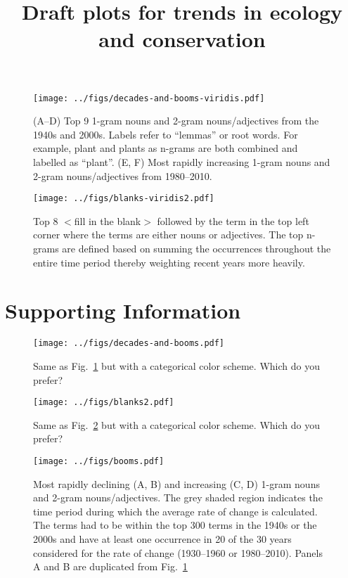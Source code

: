 \documentclass[12pt]{article}
\title{Draft plots for trends in ecology and conservation}
\author{}
\begin{document}
\maketitle


\begin{figure}[htbp]
\centering
\texttt{[image: ../figs/decades-and-booms-viridis.pdf]}
\caption{
(A--D) Top 9 1-gram nouns and 2-gram nouns/adjectives from the 1940s and 2000s.
Labels refer to ``lemmas'' or root words. For example, plant and plants as
n-grams are both combined and labelled as ``plant''. (E, F) Most rapidly
increasing 1-gram nouns and 2-gram nouns/adjectives from 1980--2010.}
\label{fig:decades}
\end{figure}

\begin{figure}[htbp]
\centering
\texttt{[image: ../figs/blanks-viridis2.pdf]}
\caption{Top 8 $<$fill in the blank$>$ followed by the term in the top left
corner where the terms are either nouns or adjectives. The top n-grams are
defined based on summing the occurrences throughout the entire time period
thereby weighting recent years more heavily.}
\label{fig:top}
\end{figure}

\clearpage

\section{Supporting Information}

\renewcommand{\thefigure}{S\arabic{figure}}
\renewcommand{\thetable}{S\arabic{table}}
\setcounter{figure}{0}
\setcounter{table}{0}

\begin{figure}[htbp]
\centering
\texttt{[image: ../figs/decades-and-booms.pdf]}
\caption{
Same as Fig.~\ref{fig:decades} but with a categorical color scheme. Which do you
prefer?}
\label{fig:decades-categorical}
\end{figure}

\begin{figure}[htbp]
\centering
\texttt{[image: ../figs/blanks2.pdf]}
\caption{
Same as Fig.~\ref{fig:top} but with a categorical color scheme. Which do you
prefer?}
\label{fig:top-categorical}
\end{figure}


\begin{figure}[htbp]
\centering
\texttt{[image: ../figs/booms.pdf]}
\caption{Most rapidly declining (A, B) and increasing (C, D) 1-gram nouns and
  2-gram nouns/adjectives. The grey shaded region indicates the time period
  during which the average rate of change is calculated. The terms had to be
  within the top 300 terms in the 1940s or the 2000s and have at least one
occurrence in 20 of the 30 years considered for the rate of change (1930--1960 or 1980--2010). Panels A and B are duplicated from Fig.~\ref{fig:decades}}
\label{fig:booms}
\end{figure}
\end{document}
